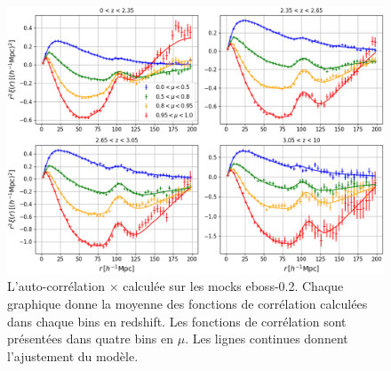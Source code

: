 \begin{figure}
  \centering
  \includegraphics[scale=0.4]{cf_eboss02_4bins}
  \caption{L'auto-corrélation \lya{}$\times$\lya{} calculée sur les mocks eboss-0.2. Chaque graphique donne la moyenne des fonctions de corrélation calculées dans chaque bins en redshift. Les fonctions de corrélation sont présentées dans quatre bins en $\mu$. Les lignes continues donnent l'ajustement du modèle.}
  \label{fig:cf_eboss02_4bins}
\end{figure}

